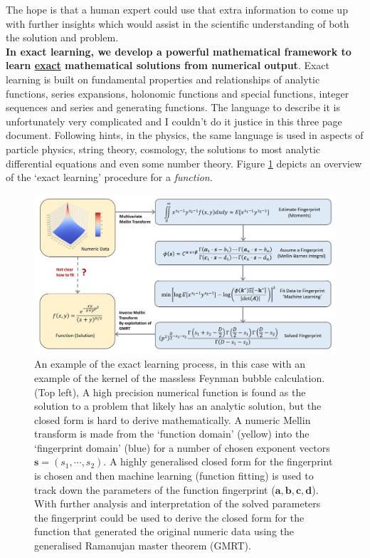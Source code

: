 \documentclass{article}
\begin{document}
The hope is that a human expert could use that extra information to come up with further insights which would assist in the scientific understanding of both the solution and problem.\\ 

\textbf{In exact learning, we develop a powerful mathematical framework to learn \underline{exact} mathematical solutions from numerical output}. Exact learning is built on fundamental properties and relationships of analytic functions, series expansions, holonomic functions and special functions, integer sequences and series and generating functions. The language to describe it is unfortunately very complicated and I couldn't do it justice in this three page document. Following hints, in the physics, the same language is used in aspects of particle physics, string theory, cosmology, the solutions to most analytic differential equations and even some number theory. Figure \ref{fig:Outline} depicts an overview of the `exact learning' procedure for a \emph{function}. 

\begin{figure}[h]
\includegraphics[scale = 0.323]{Figure1.jpg}
\caption{An example of the exact learning process, in this case with an example of the kernel of the massless Feynman bubble calculation. (Top left), A high precision numerical function is found as the solution to a problem that likely has an analytic solution, but the closed form is hard to derive mathematically. A numeric Mellin transform is made from the `function domain' (yellow) into the `fingerprint domain' (blue) for a number of chosen exponent vectors $\mathbf{s}=(s_1,\cdots,s_2)$. A highly generalised closed form for the fingerprint is chosen and then machine learning (function fitting) is used to track down the parameters of the function fingerprint ($\mathbf{a,b,c,d}$). With further analysis and interpretation of the solved parameters the fingerprint could be used to derive the closed form for the function that generated the original numeric data using the generalised Ramanujan master theorem (GMRT).}
\label{fig:Outline}
\end{figure}
\end{document}
